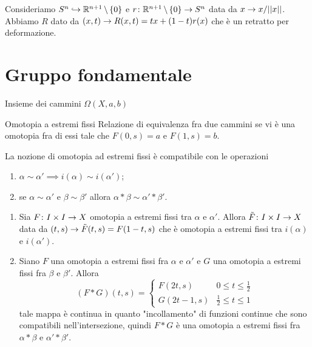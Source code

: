 \documentclass[a4paper]{article}
\begin{document}
\begin{snippetexample}{}
    Consideriamo \(S^n \hookrightarrow \mathbb{R}^{n+1} \,\backslash\, \{0\}\)
    e \(r \colon \mathbb{R}^{n+1} \,\backslash\, \{0\} \to S^n\)
    data da \(x \to x / ||x||\).
    Abbiamo \(R\) dato da \((x,t) \to R(x,t) = tx + (1-t)r(x)\)
    che è un retratto per deformazione.
\end{snippetexample}

\pagebreak

\section{Gruppo fondamentale}

\begin{snippetdefinition}{Insieme dei cammini}
    \(\Omega(X, a, b)\)
\end{snippetdefinition}

\begin{snippetdefinition}{Omotopia a estremi fissi}
    Relazione di equivalenza fra due cammini
    se vi è una omotopia fra di essi tale che
    \(F(0,s) = a\) e \(F(1, s) = b\).
\end{snippetdefinition}

\begin{snippetproposition}{}
    La nozione di omotopia ad estremi fissi è compatibile con le operazioni
    \begin{enumerate}
        \item \(\alpha \sim \alpha' \implies i(\alpha) \sim i(\alpha')\);
        \item se \(\alpha \sim \alpha'\)
        e \(\beta \sim \beta'\) allora
        \(\alpha \ast \beta \sim \alpha' \ast \beta'\).
    \end{enumerate}
\end{snippetproposition}

\begin{snippetproof}{}
    \begin{enumerate}
        \item Sia \(F \colon I \times I \to X\)
        omotopia a estremi fissi tra \(\alpha\) e \(\alpha'\).
        Allora \(\tilde F \colon I \times I \to X\)
        data da \((t,s) \to \tilde F(t,s) = F(1-t,s)\)
        che è omotopia a estremi fissi tra \(i(\alpha)\)
        e \(i(\alpha')\).
        \item Siano \(F\) una omotopia a estremi fissi fra
        \(\alpha\) e \(\alpha'\)
        e \(G\) una omotopia a estremi fissi fra \(\beta\)
        e \(\beta'\).
        Allora
        \[
            (F \ast G)(t,s) = \begin{cases}
                F(2t, s) & 0 \leq t \leq \frac12 \\
                G(2t-1, s) & \frac12 \leq t \leq 1
            \end{cases}
        \]
        tale mappa è continua in quanto "incollamento"
        di funzioni continue che sono compatibili nell'intersezione,
        quindi \(F \ast G\) è una omotopia a estremi fissi
        fra \(\alpha \ast \beta\) e \(\alpha' \ast \beta'\).
    \end{enumerate}
\end{snippetproof}
\end{document}
